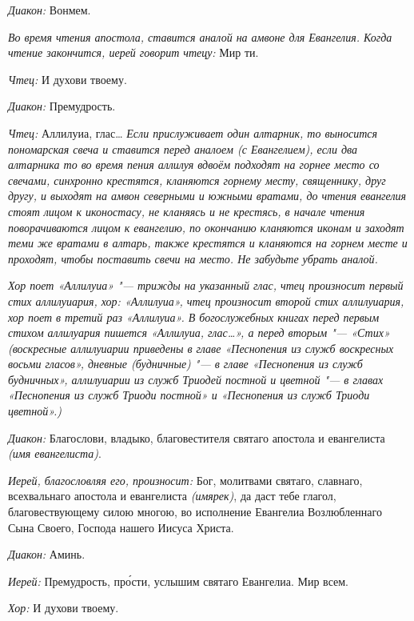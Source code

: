 \begin{mymulticols}
{\itshape Диакон:} Вонмем.


{\itshape Во время чтения апостола, ставится аналой на амвоне для Евангелия. Когда чтение закончится, иерей говорит чтецу:} Мир ти.

{\itshape Чтец:} И духови твоему.


{\itshape Диакон:} Премудрость.

{\itshape Чтец:} Аллилуиа, глас… {\itshape Если прислуживает один алтарник, то выносится пономарская свеча и ставится перед аналоем (с Евангелием), если два алтарника то во время пения аллилуя вдвоём подходят на горнее место со свечами, синхронно крестятся, кланяются горнему месту, священнику, друг другу, и выходят на амвон северными и южными вратами, до чтения евангелия стоят лицом к иконостасу, не кланяясь и не крестясь, в начале чтения поворачиваются лицом к евангелию, по окончанию кланяются иконам и заходят теми же вратами в алтарь, также крестятся и кланяются на горнем месте и проходят, чтобы поставить свечи на место. Не забудьте убрать аналой.}

{\itshape Хор поет «Аллилуиа» "--- трижды на указанный глас, чтец произносит первый стих аллилуиария, хор: «Аллилуиа», чтец произносит второй стих аллилуиария, хор поет в третий раз «Аллилуиа». В богослужебных книгах перед первым стихом аллилуария пишется «Аллилуиа, глас…», а перед вторым "--- «Стих» (воскресные аллилуиарии приведены в главе «Песнопения из служб воскресных восьми гласов», дневные (будничные) "--- в главе «Песнопения из служб будничных», аллилуиарии из служб Триодей постной и цветной "--- в главах «Песнопения из служб Триоди постной» и «Песнопения из служб Триоди цветной».) }

{\itshape Диакон:} Благослови, владыко, благовестителя святаго апостола и евангелиста {\itshape (имя евангелиста)}.

{\itshape Иерей, благословляя его, произносит:} Бог, молитвами святаго, славнаго, всехвальнаго апостола и евангелиста {\itshape (имярек)}, да даст тебе глагол, благовествующему силою многою, во исполнение Евангелиа Возлюбленнаго Сына Своего, Господа нашего Иисуса Христа.

{\itshape Диакон:} Аминь.

{\itshape Иерей:} Премудрость, пр\'{о}сти, услышим святаго Евангелиа. Мир всем.

{\itshape Хор:} И духови твоему.


\end{mymulticols}
